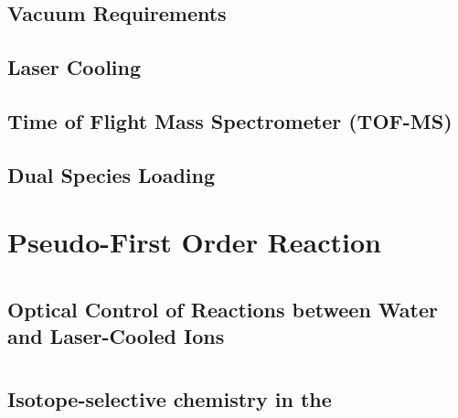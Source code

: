 \documentclass [PhD,nolistoftables,scheader] {uclathes}
\begin{document}
	\section{Vacuum Requirements}
	
	
	\section{ Laser Cooling}
	

	\section{Time of Flight Mass Spectrometer (TOF-MS)}
	
	
	\section{Dual Species Loading}
	
	
\chapter{Pseudo-First Order Reaction}


\chapter{}
	\section{Optical Control of Reactions between Water and Laser-Cooled  Ions}
	

\chapter{}
	\section{Isotope-selective chemistry in the  }
	

\chapter{}
	
\end{document}
